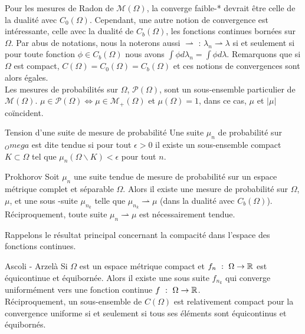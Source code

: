 \documentclass[a4paper,12pt]{article}
\renewcommand{\lstlistingname}{Code}%
\renewcommand{\lstlistlistingname}{Liste des \lstlistingname s}%
\begin{document}
\begin{appendices}
Pour les mesures de Radon de $\mathcal{M}(\Omega)$, la converge faible-* devrait être celle de la dualité avec $C_0(\Omega)$. Cependant, une autre notion de convergence est intéressante, celle avec la dualité de $C_b(\Omega)$, les fonctions continues bornées sur $\Omega$. Par abus de notations, nous la noterons aussi $\rightharpoonup$ : $\lambda_n\rightharpoonup\lambda$ si et seulement si pour toute fonction $\phi\in C_b(\Omega)$ nous avons $\int \phi d\lambda_n=\int \phi d\lambda$. Remarquons que si $\Omega$ est compact, $C(\Omega)=C_0(\Omega)=C_b(\Omega)$ et ces notions de convergences sont alors égales. \\

Les mesures de probabilités sur $\Omega$, $\mathcal{P}(\Omega)$, sont un sous-ensemble particulier de $\mathcal{M}(\Omega)$. $\mu\in\mathcal{P}(\Omega) \Leftrightarrow \mu \in\mathcal{M}_+(\Omega)$ et $\mu(\Omega) = 1$, dans ce cas, $\mu$ et $|\mu |$ coïncident. 
\begin{definition}{Tension d'une suite de mesure de probabilité}
Une suite $\mu_n$ de probabilité sur $_Omega$ est dite tendue si pour tout $\epsilon>0$ il existe un sous-ensemble compact $K\subset\Omega$ tel que $\mu_n(\Omega\backslash K) <\epsilon$ pour tout $n$. 
\end{definition}
\begin{theoreme}{Prokhorov}
\label{thm:prokhorov}
Soit $\mu_n$ une suite tendue de mesure de probabilité sur un espace métrique complet et séparable $\Omega$. Alors il existe une mesure de probabilité sur $\Omega$, $\mu$, et une sous -suite $\mu_{n_k}$ telle que $\mu_{n_k} \rightharpoonup \mu$ (dans la dualité avec $C_b(\Omega)$). \\
Réciproquement, toute suite $\mu_n\rightharpoonup \mu$ est nécessairement tendue.  
\end{theoreme}

Rappelons le résultat principal concernant la compacité dans l'espace des fonctions continues. 
\begin{theoreme}{Ascoli - Arzelà}
\label{thm:ascoli}
Si $\Omega$ est un espace métrique compact et $f_n\ :\ \Omega\rightarrow\RR$ est équicontinue et équibornée. Alors il existe une sous suite $f_{n_k}$ qui converge uniformément vers une fonction continue $f\ :\ \Omega\rightarrow\mathbb{R}$. \\
Réciproquement, un sous-ensemble de $C(\Omega)$ est relativement compact pour la convergence uniforme si et seulement si tous ses éléments sont équicontinus et équibornés.
\end{theoreme}











\end{appendices}


\newpage
{}
\listoffigures
\addcontentsline{toc}{section}{\lstlistlistingname}
\lstlistoflistings
\end{document}
